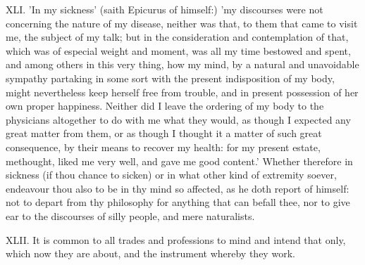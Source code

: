 XLI. 'In my sickness' (saith Epicurus of himself:) 'my discourses were
not concerning the nature of my disease, neither was that, to them that
came to visit me, the subject of my talk; but in the consideration and
contemplation of that, which was of especial weight and moment, was all my
time bestowed and spent, and among others in this very thing, how my mind,
by a natural and unavoidable sympathy partaking in some sort with the
present indisposition of my body, might nevertheless keep herself free
from trouble, and in present possession of her own proper happiness.
Neither did I leave the ordering of my body to the physicians altogether
to do with me what they would, as though I expected any great matter from
them, or as though I thought it a matter of such great consequence, by
their means to recover my health: for my present estate, methought, liked
me very well, and gave me good content.' Whether therefore in sickness (if
thou chance to sicken) or in what other kind of extremity soever,
endeavour thou also to be in thy mind so affected, as he doth report of
himself: not to depart from thy philosophy for anything that can befall
thee, nor to give ear to the discourses of silly people, and mere
naturalists.

XLII. It is common to all trades and professions to mind and intend that
only, which now they are about, and the instrument whereby they work.

